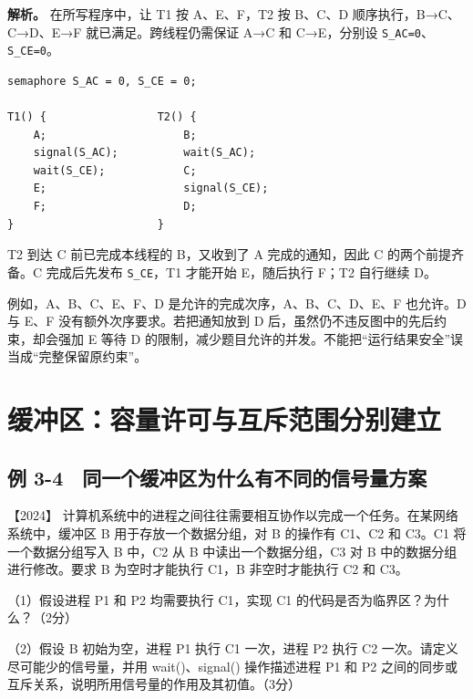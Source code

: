 
\textbf{解析。} 在所写程序中，让 T1 按 A、E、F，T2 按 B、C、D 顺序执行，B→C、C→D、E→F 就已满足。跨线程仍需保证 A→C 和 C→E，分别设 \allowbreak{}\texttt{S\_AC=0}、\allowbreak{}\texttt{S\_CE=0}。

\par\medskip\noindent
\begin{minipage}{\linewidth}
\begin{verbatim}
semaphore S_AC = 0, S_CE = 0;

T1() {                 T2() {
    A;                     B;
    signal(S_AC);          wait(S_AC);
    wait(S_CE);            C;
    E;                     signal(S_CE);
    F;                     D;
}                      }
\end{verbatim}
\end{minipage}\par\medskip

T2 到达 C 前已完成本线程的 B，又收到了 A 完成的通知，因此 C 的两个前提齐备。C 完成后先发布 \allowbreak{}\texttt{S\_CE}，T1 才能开始 E，随后执行 F；T2 自行继续 D。

例如，A、B、C、E、F、D 是允许的完成次序，A、B、C、D、E、F 也允许。D 与 E、F 没有额外次序要求。若把通知放到 D 后，虽然仍不违反图中的先后约束，却会强加 E 等待 D 的限制，减少题目允许的并发。不能把``运行结果安全''误当成``完整保留原约束''。

\section{缓冲区：容量许可与互斥范围分别建立}\label{sec-buffer}

\subsection{例 3-4　同一个缓冲区为什么有不同的信号量方案}\label{ex-2024}

\noindent{}【2024】 计算机系统中的进程之间往往需要相互协作以完成一个任务。在某网络系统中，缓冲区 B 用于存放一个数据分组，对 B 的操作有 C1、C2 和 C3。C1 将一个数据分组写入 B 中，C2 从 B 中读出一个数据分组，C3 对 B 中的数据分组进行修改。要求 B 为空时才能执行 C1，B 非空时才能执行 C2 和 C3。

（1）假设进程 P1 和 P2 均需要执行 C1，实现 C1 的代码是否为临界区？为什么？（2分）

（2）假设 B 初始为空，进程 P1 执行 C1 一次，进程 P2 执行 C2 一次。请定义尽可能少的信号量，并用 wait()、signal() 操作描述进程 P1 和 P2 之间的同步或互斥关系，说明所用信号量的作用及其初值。（3分）

